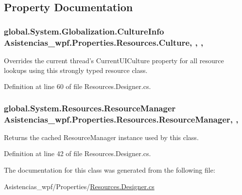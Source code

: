 \subsection{Property Documentation}
\hypertarget{class_asistencias__wpf_1_1_properties_1_1_resources_a4f2fb192b65717cb577760722969d43a}{
\subsubsection[{Culture}]{\setlength{\rightskip}{0pt plus 5cm}global.\-System.\-Globalization.\-Culture\-Info Asistencias\-\_\-wpf.\-Properties.\-Resources.\-Culture\hspace{0.3cm}{\ttfamily [static]}, {\ttfamily [get]}, {\ttfamily [set]}, {\ttfamily [package]}}}\label{class_asistencias__wpf_1_1_properties_1_1_resources_a4f2fb192b65717cb577760722969d43a}


Overrides the current thread's Current\-U\-I\-Culture property for all resource lookups using this strongly typed resource class. 



Definition at line 60 of file Resources.\-Designer.\-cs.

\hypertarget{class_asistencias__wpf_1_1_properties_1_1_resources_a86d17a0f8966f64f001f0edaf956dfc0}{
\subsubsection[{Resource\-Manager}]{\setlength{\rightskip}{0pt plus 5cm}global.\-System.\-Resources.\-Resource\-Manager Asistencias\-\_\-wpf.\-Properties.\-Resources.\-Resource\-Manager\hspace{0.3cm}{\ttfamily [static]}, {\ttfamily [get]}, {\ttfamily [package]}}}\label{class_asistencias__wpf_1_1_properties_1_1_resources_a86d17a0f8966f64f001f0edaf956dfc0}


Returns the cached Resource\-Manager instance used by this class. 



Definition at line 42 of file Resources.\-Designer.\-cs.



The documentation for this class was generated from the following file\-:\begin{DoxyCompactItemize}
\item 
Asistencias\-\_\-wpf/\-Properties/\hyperlink{_asistencias__wpf_2_properties_2_resources_8_designer_8cs}{Resources.\-Designer.\-cs}\end{DoxyCompactItemize}
